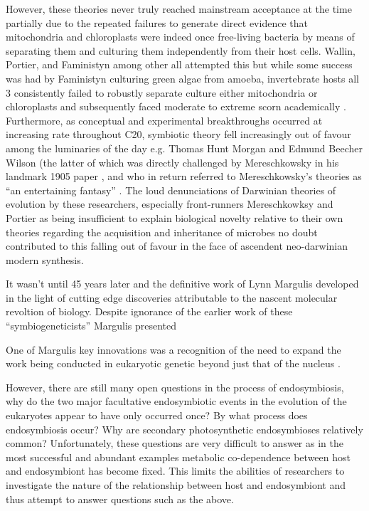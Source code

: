 However, these theories never truly reached mainstream acceptance at the time
partially due to the repeated failures to generate direct evidence that mitochondria
and chloroplasts were indeed once free-living bacteria by means of separating them
and culturing them independently from their host cells.  Wallin, Portier, and Faministyn
among other all attempted this but while some success was had by Faministyn
culturing green algae from amoeba, invertebrate hosts all 3 consistently failed
to robustly separate culture either mitochondria or chloroplasts and subsequently
faced moderate to extreme scorn academically \citep{Archibald2014}.
Furthermore, as conceptual and experimental breakthroughs occurred at increasing
rate throughout C20, symbiotic theory fell increasingly out of favour among
the luminaries of the day e.g. Thomas Hunt Morgan and Edmund Beecher Wilson (the
latter of which was directly challenged by Mereschkowsky in his landmark 1905
paper \citep{Mereschkowsky1905,Martin1999a}, and who in return referred to Mereschkowsky's
theories as ``an entertaining fantasy'' \citep{Wilson1928,Martin1999a}
\citep{Archibald2014}. The loud denunciations of Darwinian theories of evolution
by these researchers, especially front-runners Mereschkowksy and Portier as being
insufficient to explain biological novelty relative to their own theories
regarding the acquisition and inheritance of microbes \citep{Sapp2002} no doubt
contributed to this falling out of favour in the face of ascendent neo-darwinian
modern synthesis.


It wasn't until 45 years later and the definitive work of Lynn Margulis \citep{Sagan1967} 
developed in the light of cutting edge discoveries attributable to the nascent
molecular revoltion of biology. Despite ignorance of the earlier work of these 
``symbiogeneticists'' \citep{Archibald2014} Margulis presented 


One of Margulis key innovations was a recognition of the need to expand the
work being conducted in eukaryotic genetic beyond just that of the nucleus
\citep{Archibald2012}.





However, there are still many open questions in the process of endosymbiosis,
why do the two major facultative endosymbiotic events in the evolution of the eukaryotes
appear to have only occurred once? By what process does endosymbiosis occur?
Why are secondary photosynthetic endosymbioses relatively common?
Unfortunately, these questions are very difficult to answer as in the most successful
and abundant examples metabolic co-dependence between host and endosymbiont has become
fixed.  This limits the abilities of researchers to investigate the nature of the
relationship between host and endosymbiont and thus attempt to answer questions
such as the above. 

